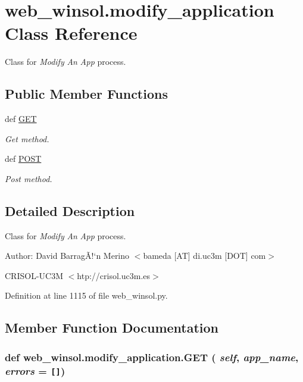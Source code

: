 \hypertarget{classweb__winsol_1_1modify__application}{
\section{web\_\-winsol.modify\_\-application Class Reference}
\label{classweb__winsol_1_1modify__application}
}
Class for {\em Modify\/} {\em An\/} {\em App\/} process.  


\subsection*{Public Member Functions}
\begin{CompactItemize}
\item 
def \hyperlink{classweb__winsol_1_1modify__application_991cef0859943046247b8beceb089ca6}{GET}
\begin{CompactList}\small\item\em Get method. \item\end{CompactList}\item 
def \hyperlink{classweb__winsol_1_1modify__application_8e743499bcafd9254a3d46558131eb57}{POST}
\begin{CompactList}\small\item\em Post method. \item\end{CompactList}\end{CompactItemize}


\subsection{Detailed Description}
Class for {\em Modify\/} {\em An\/} {\em App\/} process. 

\begin{Desc}
\item[Author:]David Barrag\~{A}!`n Merino $<$bameda \mbox{[}AT\mbox{]} di.uc3m \mbox{[}DOT\mbox{]} com$>$ 

CRISOL-UC3M $<$htp://crisol.uc3m.es$>$ \end{Desc}




Definition at line 1115 of file web\_\-winsol.py.

\subsection{Member Function Documentation}
\hypertarget{classweb__winsol_1_1modify__application_991cef0859943046247b8beceb089ca6}{
\subsubsection[GET]{\setlength{\rightskip}{0pt plus 5cm}def web\_\-winsol.modify\_\-application.GET ( {\em self},  {\em app\_\-name},  {\em errors} = {\tt \mbox{[}\mbox{]}})}}
\label{classweb__winsol_1_1modify__application_991cef0859943046247b8beceb089ca6}


